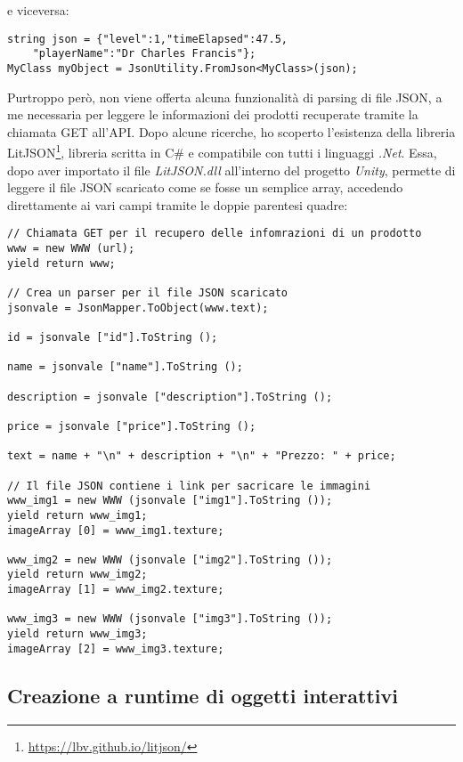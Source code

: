 e viceversa:

\begin{lstlisting}[style=MyCStyle]
string json = {"level":1,"timeElapsed":47.5,
	"playerName":"Dr Charles Francis"};
MyClass myObject = JsonUtility.FromJson<MyClass>(json);
\end{lstlisting}

Purtroppo però, non viene offerta alcuna funzionalità di parsing di file JSON, a me necessaria per leggere le informazioni dei prodotti recuperate tramite la chiamata GET all'API. Dopo alcune ricerche, ho scoperto l'esistenza della libreria LitJSON\footnote[4]{\url{https://lbv.github.io/litjson/}}, libreria scritta in C\# e compatibile con tutti i linguaggi \textit{.Net}. Essa, dopo aver importato il file \textit{LitJSON.dll} all'interno del progetto \textit{Unity}, permette di leggere il file JSON scaricato come se fosse un semplice array, accedendo direttamente ai vari campi tramite le doppie parentesi quadre:

\begin{lstlisting}[style=MyCStyle]
// Chiamata GET per il recupero delle infomrazioni di un prodotto
www = new WWW (url);
yield return www;

// Crea un parser per il file JSON scaricato
jsonvale = JsonMapper.ToObject(www.text);

id = jsonvale ["id"].ToString ();

name = jsonvale ["name"].ToString ();

description = jsonvale ["description"].ToString ();

price = jsonvale ["price"].ToString ();

text = name + "\n" + description + "\n" + "Prezzo: " + price;

// Il file JSON contiene i link per sacricare le immagini
www_img1 = new WWW (jsonvale ["img1"].ToString ());
yield return www_img1;
imageArray [0] = www_img1.texture;

www_img2 = new WWW (jsonvale ["img2"].ToString ());
yield return www_img2;
imageArray [1] = www_img2.texture;

www_img3 = new WWW (jsonvale ["img3"].ToString ());
yield return www_img3;
imageArray [2] = www_img3.texture;
\end{lstlisting}

\hypertarget{3.3.4}{\subsection{Creazione a runtime di oggetti interattivi}}

